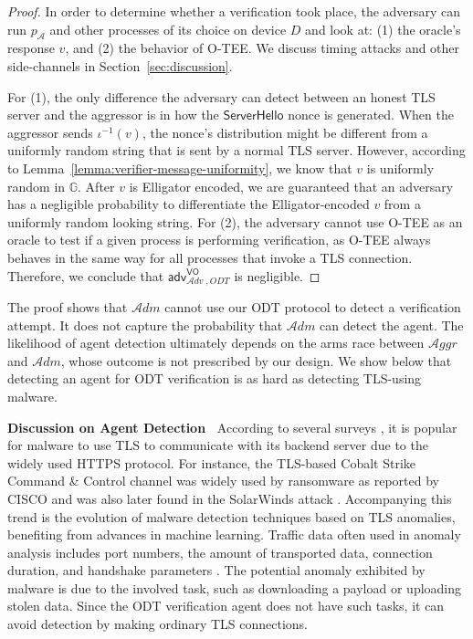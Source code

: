 \documentclass[letterpaper,twocolumn,10pt]{article}
\newcommand{\T}{\ensuremath{\mathcal{A}ggr}\xspace}
\newcommand{\ADM}{\ensuremath{\mathcal{A}dm}\xspace}
\newcommand{\alg}[1]{\mathsf{#1}}
\newcommand{\adv}{\mathcal{A}dv}
\newcommand{\GG}{\mathbb{G}}
\newcommand{\advantage}[2]{\alg{adv}^{#1}_{\adv\;\!,#2}}
\newcommand{\mypara}[1]{\vspace{.5em}\noindent\textbf{{#1}~}}
\begin{document}
\begin{proof}
In order to determine whether a verification took place, the adversary can run $p_{\mathcal{A}}$ and other processes of its choice on device $D$ and look at: (1) the oracle's response $v$, and (2) the behavior of O-TEE.
We discuss timing attacks and other side-channels in Section~\ref{sec:discussion}.

For (1), the only difference the adversary can detect between an honest TLS server and the aggressor is in how the $\textsf{ServerHello}$ nonce is generated.
When the aggressor sends $\iota^{-1}(v)$, the nonce's distribution might be different from a uniformly random string that is sent by a normal TLS server.
However, according to Lemma~\ref{lemma:verifier-message-uniformity}, we know that $v$ is uniformly random in $\GG$.
After $v$ is Elligator encoded, we are guaranteed that an adversary has a negligible probability to differentiate the Elligator-encoded $v$ from a uniformly random looking string.
For (2), the adversary cannot use O-TEE as an oracle to test if a given process is performing verification, as O-TEE always behaves in the same way for all processes that invoke a TLS connection.
Therefore, we conclude that $\advantage{\mathsf{VO}}{\mathit{ODT}}$ is negligible.
\end{proof}

The proof shows that \ADM cannot use our ODT protocol to detect a verification attempt.
It does not capture the probability that \ADM can detect the agent.
The likelihood of agent detection ultimately depends on the arms race between \T and \ADM, whose outcome is not prescribed by our design.
We show below that detecting an agent for ODT verification is as hard as detecting TLS-using malware.

\mypara{Discussion on Agent Detection}
According to several surveys \cite{OR19,oh2021survey}, it is popular for malware to use TLS to communicate with its backend server due to the widely used HTTPS protocol. For instance, the TLS-based Cobalt Strike Command \& Control channel was widely used by ransomware as reported by CISCO \cite{CISCO20} and was also later found in the SolarWinds attack \cite{Fireye}. Accompanying this trend is the evolution of malware detection techniques based on TLS anomalies, benefiting from advances in machine learning. Traffic data often used in anomaly analysis includes port numbers, the amount of transported data, connection duration, and handshake parameters \cite{AM16}. The potential anomaly exhibited by malware is due to the involved task, such as downloading a payload or uploading stolen data. Since the ODT verification agent does not have such tasks, it can avoid detection by making ordinary TLS connections.
\end{document}
